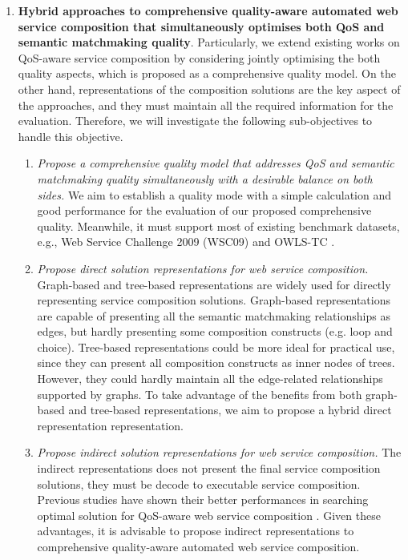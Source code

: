 \begin{enumerate}
  \item \textbf{Hybrid approaches to comprehensive quality-aware automated web service composition that simultaneously optimises both QoS and semantic matchmaking quality}. Particularly, we extend existing works on QoS-aware service composition by considering jointly optimising the both quality aspects, which is proposed as a comprehensive quality model. On the other hand, representations of the composition solutions are the key aspect of the approaches, and they must maintain all the required information for the evaluation. Therefore, we will investigate the following sub-objectives to handle this objective.
  \begin{enumerate}
    \item \emph{Propose a comprehensive quality model that addresses QoS and semantic matchmaking quality simultaneously with a desirable balance on both sides.} We aim to establish a quality mode with a simple calculation and good performance for the evaluation of our proposed comprehensive quality. Meanwhile, it must support most of existing benchmark datasets, e.g., Web Service Challenge 2009 (WSC09)\cite{kona2009wsc} and OWLS-TC \cite{kuster2008opossum}.
    
    \item \emph{Propose direct solution representations for web service composition.} Graph-based and tree-based representations are widely used for directly representing service composition solutions. Graph-based representations are capable of presenting all the semantic matchmaking relationships as edges, but hardly presenting some composition constructs (e.g. loop and choice). Tree-based representations could be more ideal for practical use, since they can present all composition constructs as inner nodes of trees. However, they could hardly maintain all the edge-related relationships supported by graphs. To take advantage of the benefits from both graph-based and tree-based representations, we aim to propose a hybrid direct representation representation. 
    
    \item \emph{Propose indirect solution representations for web service composition.} The indirect representations does not present the final service composition solutions, they must be decode to executable service composition. Previous studies have shown their better performances in searching optimal solution for QoS-aware web service composition \cite{da2016memetic,da2016particle}. Given these advantages, it is advisable to propose indirect representations to comprehensive quality-aware automated web service composition.
    

\end{enumerate}
\end{enumerate}
